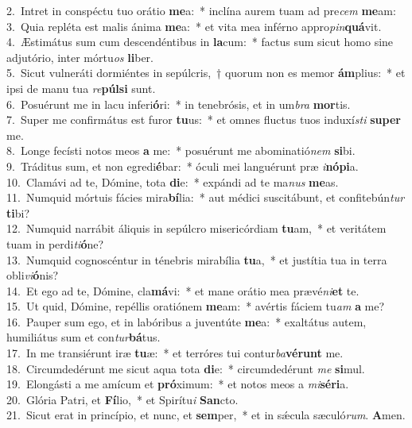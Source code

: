 {2.~}Intret in conspéctu tuo orátio \textbf{me}a:~* inclína aurem tuam ad pre\textit{cem} \textbf{me}am:\\
{3.~}Quia repléta est malis ánima \textbf{me}a:~* et vita mea inférno appro\textit{pin}\textbf{quá}vit.\\
{4.~}Æstimátus sum cum descendéntibus in \textbf{la}cum:~* factus sum sicut homo sine adjutório, inter mórtu\textit{os} \textbf{li}ber.\\
{5.~}Sicut vulneráti dormiéntes in sepúlcris,~† quorum non es memor \textbf{ám}plius:~* et ipsi de manu tua \textit{re}\textbf{púl}\textbf{si} sunt.\\
{6.~}Posuérunt me in lacu inferi\textbf{ó}ri:~* in tenebrósis, et in um\textit{bra} \textbf{mor}tis.\\
{7.~}Super me confirmátus est furor \textbf{tu}us:~* et omnes fluctus tuos induxí\textit{sti} \textbf{su}\textbf{per} me.\\
{8.~}Longe fecísti notos meos \textbf{a} me:~* posuérunt me abominatió\textit{nem} \textbf{si}bi.\\
{9.~}Tráditus sum, et non egredi\textbf{é}bar:~* óculi mei languérunt præ \textit{i}\textbf{nó}\textbf{pi}a.\\
{10.~}Clamávi ad te, Dómine, tota \textbf{di}e:~* expándi ad te ma\textit{nus} \textbf{me}as.\\
{11.~}Numquid mórtuis fácies mira\textbf{bí}lia:~* aut médici suscitábunt, et confitebún\textit{tur} \textbf{ti}bi?\\
{12.~}Numquid narrábit áliquis in sepúlcro misericórdiam \textbf{tu}am,~* et veritátem tuam in perdi\textit{ti}\textbf{ó}ne?\\
{13.~}Numquid cognoscéntur in ténebris mirabília \textbf{tu}a,~* et justítia tua in terra obli\textit{vi}\textbf{ó}nis?\\
{14.~}Et ego ad te, Dómine, cla\textbf{má}vi:~* et mane orátio mea prævé\textit{ni}\textbf{et} te.\\
{15.~}Ut quid, Dómine, repéllis oratiónem \textbf{me}am:~* avértis fáciem tu\textit{am} \textbf{a} me?\\
{16.~}Pauper sum ego, et in labóribus a juventúte \textbf{me}a:~* exaltátus autem, humiliátus sum et con\textit{tur}\textbf{bá}tus.\\
{17.~}In me transiérunt iræ \textbf{tu}æ:~* et terróres tui contur\textit{ba}\textbf{vé}\textbf{runt} me.\\
{18.~}Circumdedérunt me sicut aqua tota \textbf{di}e:~* circumdedérunt \textit{me} \textbf{si}mul.\\
{19.~}Elongásti a me amícum et \textbf{pró}ximum:~* et notos meos a \textit{mi}\textbf{sé}\textbf{ri}a.\\
{20.~}Glória Patri, et \textbf{Fí}lio,~* et Spirítu\textit{i} \textbf{San}cto.\\
{21.~}Sicut erat in princípio, et nunc, et \textbf{sem}per,~* et in sǽcula sæculó\textit{rum}. \textbf{A}men.\\
